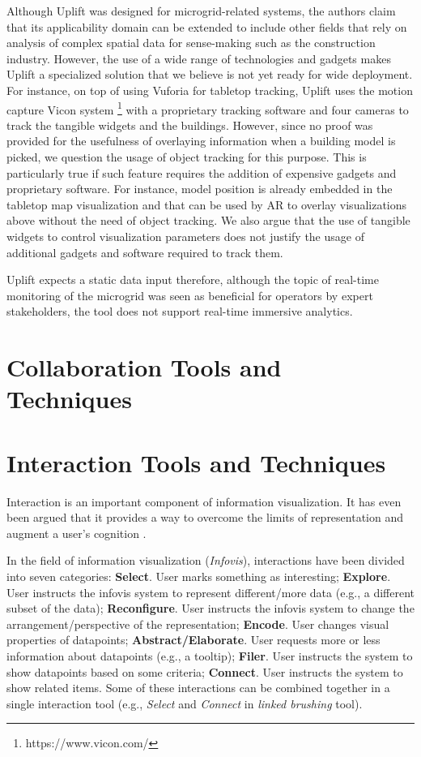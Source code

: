 \documentclass{vgtc}                          %
\begin{document}
\noindent Although Uplift was designed for microgrid-related systems,
the authors claim that its applicability domain can be extended to include
other fields that rely on analysis of complex spatial data for sense-making
such as the construction industry. However, the use of a wide range of technologies
and gadgets makes Uplift a specialized solution that we believe is not yet
ready for wide deployment. For instance, on top of using Vuforia for tabletop
tracking, Uplift uses the motion capture Vicon system
\footnote{https://www.vicon.com/} with a proprietary tracking software and four
cameras to track the tangible widgets and the buildings. However,
since no proof was provided for the usefulness of overlaying information when
a building model is picked, we question the usage of object tracking for this
purpose. This is particularly true if such feature requires the addition of
expensive gadgets and proprietary software. For instance, model position is
already embedded in the tabletop map visualization and that can be used by AR
to overlay visualizations above without the need of object tracking. We also
argue that the use of tangible widgets to control visualization parameters does
not justify the usage of additional gadgets and software required to track
them.

\medskip

\noindent Uplift expects a static data input therefore, although the topic of
real-time monitoring of the microgrid was seen as beneficial for operators by
expert stakeholders, the tool does not support real-time immersive analytics.

\section{Collaboration Tools and Techniques}

\section{Interaction Tools and Techniques}

\noindent Interaction is an important component of information visualization. It has even been argued that it provides
a way to overcome the limits of representation and augment a user's cognition \cite{interaction_infovis}.

\smallskip

\noindent In the field of information visualization (\textit{Infovis}), interactions have been divided into seven
categories: \textbf{Select}. User marks something as interesting; \textbf{Explore}. User instructs the
infovis system to represent different/more data (e.g., a different subset of the data);
\textbf{Reconfigure}. User instructs the infovis system to change the arrangement/perspective of the
representation; \textbf{Encode}. User changes visual properties of datapoints; \textbf{Abstract/Elaborate}.
User requests more or less information about datapoints (e.g., a tooltip); \textbf{Filer}. User instructs the
system to show datapoints based on some criteria; \textbf{Connect}. User instructs the system to show related
items. Some of these interactions can be combined together in a single interaction tool (e.g., \textit{Select}
and \textit{Connect} in \textit{linked brushing} tool).
\end{document}
